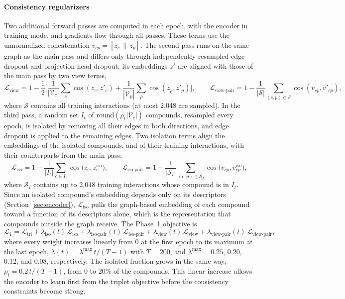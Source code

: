 \documentclass[11pt,letterpaper]{article}
\begin{document}
\paragraph{Consistency regularizers}
Two additional forward passes are computed in each epoch, with the encoder in training mode, and gradients flow through all passes. These terms use the unnormalized concatenation $v_{cp}=[z_c\,\|\,z_p]$. The second pass runs on the same graph as the main pass and differs only through independently resampled edge dropout and projection-head dropout; its embeddings $z'$ are aligned with those of the main pass by two view terms,
\[
\mathcal{L}_{\text{view}} = 1 - \frac{1}{2}\Big[\frac{1}{|\mathcal{V}_c|}\sum_{c}\cos(z_c,z'_c) + \frac{1}{|\mathcal{V}_p|}\sum_{p}\cos(z_p,z'_p)\Big],
\qquad
\mathcal{L}_{\text{view-pair}} = 1 - \frac{1}{|\mathcal{S}|}\sum_{(c,p)\in\mathcal{S}}\cos(v_{cp},v'_{cp}),
\]
where $\mathcal{S}$ contains all training interactions (at most 2,048 are sampled). In the third pass, a random set $I_t$ of $\mathrm{round}(\rho_t|\mathcal{V}_c|)$ compounds, resampled every epoch, is isolated by removing all their edges in both directions, and edge dropout is applied to the remaining edges. Two isolation terms align the embeddings of the isolated compounds, and of their training interactions, with their counterparts from the main pass:
\[
\mathcal{L}_{\text{iso}} = 1 - \frac{1}{|I_t|}\sum_{c\in I_t}\cos\big(z_c, z_c^{\text{iso}}\big),
\qquad
\mathcal{L}_{\text{iso-pair}} = 1 - \frac{1}{|\mathcal{S}_I|}\sum_{(c,p)\in\mathcal{S}_I}\cos\big(v_{cp}, v_{cp}^{\text{iso}}\big),
\]
where $\mathcal{S}_I$ contains up to 2,048 training interactions whose compound is in $I_t$. Since an isolated compound's embedding depends only on its descriptors (Section~\ref{sec:encoder}), $\mathcal{L}_{\text{iso}}$ pulls the graph-based embedding of each compound toward a function of its descriptors alone, which is the representation that compounds outside the graph receive. The Phase~1 objective is
\begin{equation}
\mathcal{L}_1 = \mathcal{L}_{\text{tri}} + \lambda_{\text{iso}}(t)\,\mathcal{L}_{\text{iso}} + \lambda_{\text{iso-pair}}(t)\,\mathcal{L}_{\text{iso-pair}} + \lambda_{\text{view}}(t)\,\mathcal{L}_{\text{view}} + \lambda_{\text{view-pair}}(t)\,\mathcal{L}_{\text{view-pair}},
\end{equation}
where every weight increases linearly from 0 at the first epoch to its maximum at the last epoch, $\lambda(t)=\lambda^{\max}\,t/(T-1)$ with $T=200$, and $\lambda^{\max}=0.25$, 0.20, 0.12, and 0.08, respectively. The isolated fraction grows in the same way, $\rho_t=0.2\,t/(T-1)$, from 0 to 20\% of the compounds. This linear increase allows the encoder to learn first from the triplet objective before the consistency constraints become strong.
\end{document}
